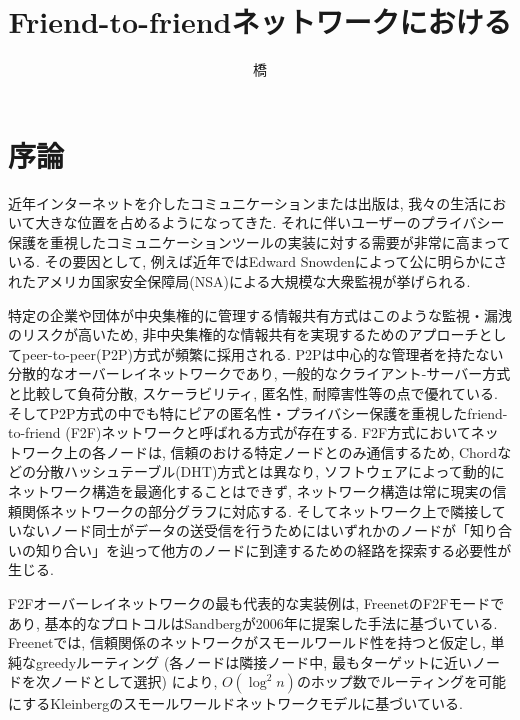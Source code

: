\documentclass[dvipdfmx]{ampbt}
\title{Friend-to-friendネットワークにおける} %
      {効率的な分散ルーティング}                         %
      {}                                         %
\author{\CID{8705}橋}{彰}             %
\begin{document}
\ifoutputbody
\makeinsidecover                %
\makeabstract                   %
\maketoc                        %
\setcounter{page}{1}            %
\section{序論}
近年インターネットを介したコミュニケーションまたは出版は, 我々の生活において大きな位置を占めるようになってきた. それに伴いユーザーのプライバシー保護を重視したコミュニケーションツールの実装に対する需要が非常に高まっている. その要因として, 例えば近年ではEdward Snowdenによって公に明らかにされたアメリカ国家安全保障局(NSA)による大規模な大衆監視が挙げられる\cite{snowden}.

特定の企業や団体が中央集権的に管理する情報共有方式はこのような監視・漏洩のリスクが高いため, 非中央集権的な情報共有を実現するためのアプローチとしてpeer-to-peer(P2P)方式が頻繁に採用される. P2Pは中心的な管理者を持たない分散的なオーバーレイネットワークであり, 一般的なクライアント-サーバー方式と比較して負荷分散, スケーラビリティ, 匿名性, 耐障害性等の点で優れている\cite{lua2005survey}. そしてP2P方式の中でも特にピアの匿名性・プライバシー保護を重視したfriend-to-friend (F2F)\cite{bricklin2000friend}ネットワークと呼ばれる方式が存在する. F2F方式においてネットワーク上の各ノードは, 信頼のおける特定ノードとのみ通信するため, Chord\cite{stoica2001chord}などの分散ハッシュテーブル(DHT)方式とは異なり, ソフトウェアによって動的にネットワーク構造を最適化することはできず, ネットワーク構造は常に現実の信頼関係ネットワークの部分グラフに対応する. そしてネットワーク上で隣接していないノード同士がデータの送受信を行うためにはいずれかのノードが「知り合いの知り合い」を辿って他方のノードに到達するための経路を探索する必要性が生じる\cite{rogers2007disappear, roos2016analyzing}.

F2Fオーバーレイネットワークの最も代表的な実装例は, Freenet\cite{clarke2001freenet}のF2Fモード\cite{clarke2010private}であり, 基本的なプロトコルはSandbergが2006年に提案した手法\cite{sandberg2006distributed}に基づいている. Freenetでは, 信頼関係のネットワークがスモールワールド性を持つと仮定し, 単純なgreedyルーティング (各ノードは隣接ノード中, 最もターゲットに近いノードを次ノードとして選択) により, $O(\log^2 n)$のホップ数でルーティングを可能にするKleinbergのスモールワールドネットワークモデル\cite{kleinberg2000small}に基づいている.
\end{document}
